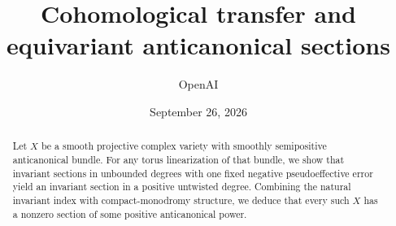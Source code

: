 \documentclass[11pt]{amsart}
\title[Cohomological transfer and anticanonical sections]{Cohomological transfer and equivariant anticanonical sections}
\author{OpenAI}
\date{September 26, 2026}
\theoremstyle{definition}
\theoremstyle{remark}
\begin{document}
\begin{abstract}
Let $X$ be a smooth projective complex variety with smoothly semipositive anticanonical bundle. For any torus linearization of that bundle, we show that invariant sections in unbounded degrees with one fixed negative pseudoeffective error yield an invariant section in a positive untwisted degree. Combining the natural invariant index with compact-monodromy structure, we deduce that every such $X$ has a nonzero section of some positive anticanonical power.
\end{abstract}
\maketitle
\tableofcontents














\clearpage


\end{document}
